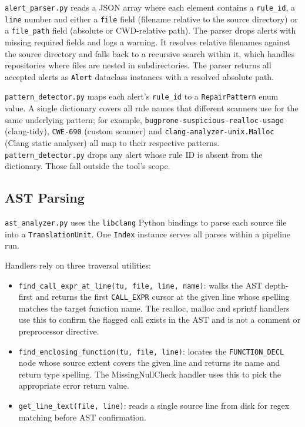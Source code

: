 \texttt{alert\_parser.py} reads a JSON array where each element contains a \texttt{rule\_id}, a \texttt{line} number and either a \texttt{file} field (filename relative to the source directory) or a \texttt{file\_path} field (absolute or CWD-relative path). The parser drops alerts with missing required fields and logs a warning. It resolves relative filenames against the source directory and falls back to a recursive search within it, which handles repositories where files are nested in subdirectories. The parser returns all accepted alerts as \texttt{Alert} dataclass instances with a resolved absolute path.

\texttt{pattern\_detector.py} maps each alert's \texttt{rule\_id} to a \texttt{RepairPattern} enum value. A single dictionary covers all rule names that different scanners use for the same underlying pattern; for example, \texttt{bugprone-suspicious-realloc-usage} (clang-tidy), \texttt{CWE-690} (custom scanner) and \texttt{clang-analyzer-unix.Malloc} (Clang static analyser) all map to their respective patterns. \texttt{pattern\_detector.py} drops any alert whose rule ID is absent from the dictionary. Those fall outside the tool's scope.

\subsection{AST Parsing}

\texttt{ast\_analyzer.py} uses the \texttt{libclang} Python bindings to parse each source file into a \texttt{Trans\-lation\-Unit}. One \texttt{Index} instance serves all parses within a pipeline run.

Handlers rely on three traversal utilities:

\begin{itemize}
  \item \texttt{find\_call\_expr\_at\_line(tu, file, line, name)}: walks the AST depth-first and returns the first \texttt{CALL\_EXPR} cursor at the given line whose spelling matches the target function name. The realloc, malloc and sprintf handlers use this to confirm the flagged call exists in the AST and is not a comment or preprocessor directive.
  \item \texttt{find\_enclosing\_function}\allowbreak\texttt{(tu, file, line)}: locates the \texttt{FUNCTION\_DECL} node whose source extent covers the given line and returns its name and return type spelling. The MissingNullCheck handler uses this to pick the appropriate error return value.
  \item \texttt{get\_line\_text(file, line)}: reads a single source line from disk for regex matching before AST confirmation.
\end{itemize}

